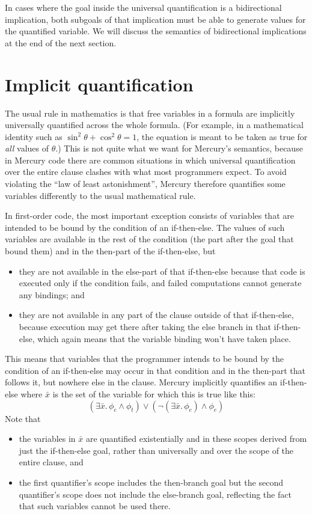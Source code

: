 In cases where the goal inside the universal quantification
is a bidirectional implication,
both subgoals of that implication
must be able to generate values for the quantified variable.
We will discuss the semantics of bidirectional implications
at the end of the next section.


\section{Implicit quantification}
\label{sec:implicit-quantification}

The usual rule in mathematics
is that free variables in a formula
are implicitly universally quantified across the whole formula.
(For example,
in a mathematical identity such as
$\sin^2\theta + \cos^2\theta = 1$,
the equation is meant to be taken as true
for \emph{all} values of $\theta$.)
This is not quite what we want for Mercury's semantics,
because in Mercury code there are common situations
in which universal quantification over the entire clause
clashes with what most programmers expect.
To avoid violating the ``law of least astonishment'',
Mercury therefore quantifies some variables
differently to the usual mathematical rule.

In first-order code,
the most important exception consists of variables
that are intended to be bound by the condition of an if-then-else.
The values of such variables are available
in the rest of the condition (the part after the goal that bound them)
and in the then-part of the if-then-else, but
\begin{itemize}
\item
they are not available in the else-part of that if-then-else
because that code is executed only if the condition fails,
and failed computations cannot generate any bindings; and
\item
they are not available in any part of the clause outside of that if-then-else,
because execution may get there
after taking the else branch in that if-then-else,
which again means that the variable binding won't have taken place.
\end{itemize}

This means that variables that
the programmer intends to be bound by the condition of an if-then-else
may occur in that condition and in the then-part that follows it,
but nowhere else in the clause.
Mercury implicitly quantifies an if-then-else 
where $\bar{x}$ is the set of the variable for which this is true
like this:
\[
    (\exists \bar{x}.\, \phi_c \land \phi_t) \lor
    (\lnot (\exists \bar{x}.\, \phi_c) \land \phi_e)
\]
Note that
\begin{itemize}
\item
the variables in $\bar{x}$ are quantified existentially
and in these scopes derived from just the if-then-else goal,
rather than universally and over the scope of the entire clause, and
\item
the first quantifier's scope includes the then-branch goal
but the second quantifier's scope does not include the else-branch goal,
reflecting the fact that such variables cannot be used there.
\end{itemize}


